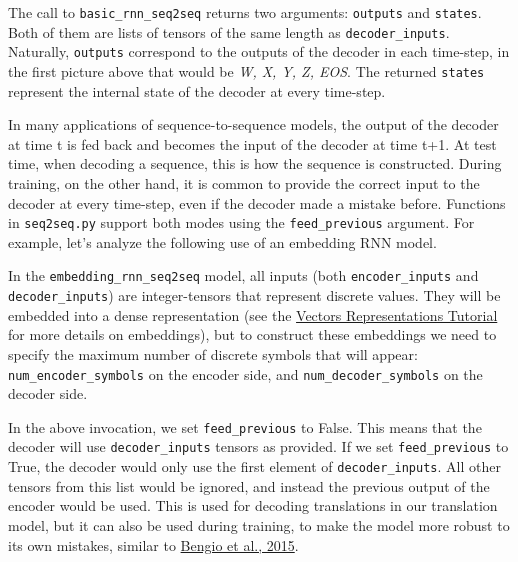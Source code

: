 The call to \texttt{basic\_rnn\_seq2seq} returns two arguments:
\texttt{outputs} and \texttt{states}. Both of them are lists of tensors
of the same length as \texttt{decoder\_inputs}. Naturally,
\texttt{outputs} correspond to the outputs of the decoder in each
time-step, in the first picture above that would be \emph{W, X, Y, Z,
EOS}. The returned \texttt{states} represent the internal state of the
decoder at every time-step.

In many applications of sequence-to-sequence models, the output of the
decoder at time t is fed back and becomes the input of the decoder at
time t+1. At test time, when decoding a sequence, this is how the
sequence is constructed. During training, on the other hand, it is
common to provide the correct input to the decoder at every time-step,
even if the decoder made a mistake before. Functions in
\texttt{seq2seq.py} support both modes using the \texttt{feed\_previous}
argument. For example, let's analyze the following use of an embedding
RNN model.

\begin{Shaded}
\begin{Highlighting}[]
\OperatorTok{=} 
    \OperatorTok{=}\OperatorTok{=}\NormalTok{)}
\end{Highlighting}
\end{Shaded}

In the \texttt{embedding\_rnn\_seq2seq} model, all inputs (both
\texttt{encoder\_inputs} and \texttt{decoder\_inputs}) are
integer-tensors that represent discrete values. They will be embedded
into a dense representation (see the
\href{tensorflow-zh/SOURCE/tutorials/word2vec/index.md}{Vectors
Representations Tutorial} for more details on embeddings), but to
construct these embeddings we need to specify the maximum number of
discrete symbols that will appear: \texttt{num\_encoder\_symbols} on the
encoder side, and \texttt{num\_decoder\_symbols} on the decoder side.

In the above invocation, we set \texttt{feed\_previous} to False. This
means that the decoder will use \texttt{decoder\_inputs} tensors as
provided. If we set \texttt{feed\_previous} to True, the decoder would
only use the first element of \texttt{decoder\_inputs}. All other
tensors from this list would be ignored, and instead the previous output
of the encoder would be used. This is used for decoding translations in
our translation model, but it can also be used during training, to make
the model more robust to its own mistakes, similar to
\href{http://arxiv.org/pdf/1506.03099v2.pdf}{Bengio et al., 2015}.

